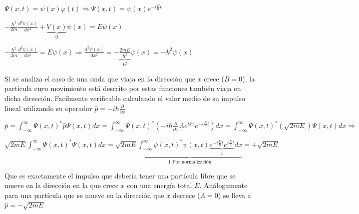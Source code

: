 \documentclass[oneside]{book}
\numberwithin{equation}{section}
\numberwithin{figure}{section}
\numberwithin{table}{section}
\begin{document}
					\begin{center}
					$\Psi(x,t)=\psi(x)\varphi(t) \Rightarrow \displaystyle \Psi(x,t)=\psi(x)e^{-i\frac{E}{\hbar}t}$\\
					\end{center}
					\begin{center}
					$\displaystyle  -\frac{\hbar^2}{2m}\frac{d^2\psi(x)}{dx^2}+\underbrace{V(x)}_{0}\psi(x)=E\psi(x)$\\					
					\end{center}				
					\begin{center}
					$\displaystyle  -\frac{\hbar^2}{2m}\frac{d^2\psi(x)}{dx^2}=E\psi(x) \Rightarrow \frac{d^2\psi(x)}{dx^2}=-\underbrace{\frac{2mE}{\hbar^2}}_{k^2}\psi(x)=-k^2\psi(x)$\\					
					\end{center}		
					\begin{center}
					\end{center}
					
					Si se analiza el caso de una onda que viaja en la dirección que $x$ crece ($B=0$), la partícula cuyo movimiento está descrito por estas funciones también viaja en dicha dirección. Facilmente verificable calculando el valor medio de su impulso lineal utilizando su operador $\hat{p}=-i\hbar\frac{\partial}{\partial x}$
					
					 \begin{center}
					 $\displaystyle \overline{p}=\int_{-\infty}^{\infty}\Psi(x,t)^*\hat{p}\Psi(x,t)dx=\int_{-\infty}^{\infty}\Psi(x,t)^*(-i\hbar\frac{\partial}{\partial x}Ae^{ikx}e^{-i\frac{E}{\hbar}t})dx=\int_{-\infty}^{\infty}\Psi(x,t)^*(\sqrt{2mE})\Psi(x,t)dx \Rightarrow$\\
					 \end{center}
					 \begin{center}
					 $\displaystyle \sqrt{2mE}\int_{-\infty}^{\infty}\Psi(x,t)^*\Psi(x,t)dx=\sqrt{2mE}\underbrace{\int_{-\infty}^{\infty}\psi(x,t)^*\psi(x,t)\underbrace{e^{-i\frac{E}{\hbar}t}e^{i\frac{E}{\hbar}t}}_1dx}_{1 \text{ Por normalización}}=+\sqrt{2mE}$
					 \end{center}
				
					Que es exactamente el impulso que debería tener una partícula libre que se mueve en la dirección en la que crece $x$ con una energía total $E$. Análogamente para una partícula que se mueve en la dirección que $x$ decrece ($A=0$) se lleva a $\hat{p}=-\sqrt{2mE}$\\
				
\end{document}
